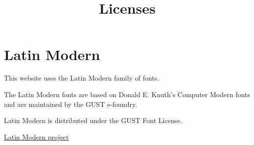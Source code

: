 \documentclass{article}
\title{Licenses}
\author{}
\date{}
\begin{document}
\maketitle

\section{Latin Modern}

This website uses the Latin Modern family of fonts.

The Latin Modern fonts are based on Donald E. Knuth's Computer Modern
fonts and are maintained by the GUST e-foundry.

Latin Modern is distributed under the GUST Font License.

\href{https://www.gust.org.pl/projects/e-foundry/latin-modern}
{Latin Modern project}
\end{document}
